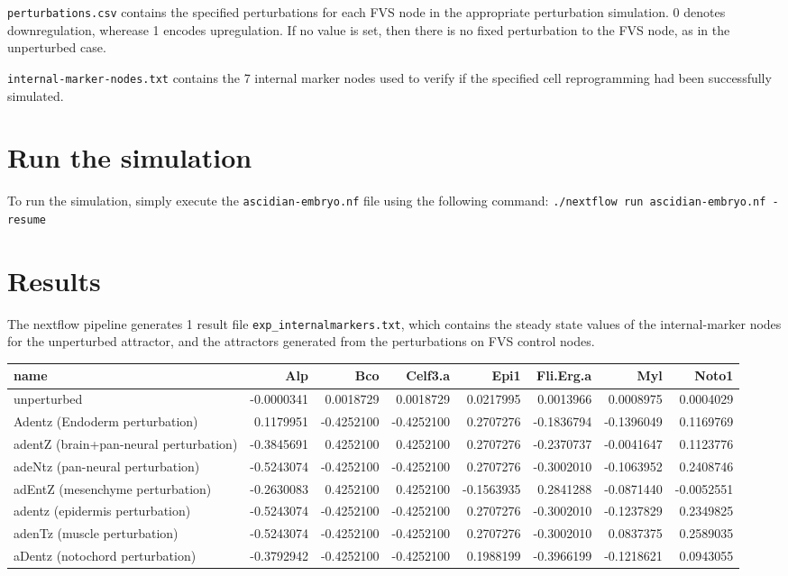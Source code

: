 \documentclass[
]{book}
\begin{document}
\texttt{perturbations.csv} contains the specified perturbations for each FVS node in the appropriate perturbation simulation. 0 denotes downregulation, wherease 1 encodes upregulation. If no value is set, then there is no fixed perturbation to the FVS node, as in the unperturbed case.

\texttt{internal-marker-nodes.txt} contains the 7 internal marker nodes used to verify if the specified cell reprogramming had been successfully simulated.

\hypertarget{run-the-simulation}{%
\section{Run the simulation}\label{run-the-simulation}}

To run the simulation, simply execute the \texttt{ascidian-embryo.nf} file using the following command: \texttt{./nextflow\ run\ ascidian-embryo.nf\ -resume}

\hypertarget{results}{%
\section{Results}\label{results}}

The nextflow pipeline generates 1 result file \texttt{exp\_internalmarkers.txt}, which contains the steady state values of the internal-marker nodes for the unperturbed attractor, and the attractors generated from the perturbations on FVS control nodes.

\begin{table}
\centering\begingroup\fontsize{8}{10}\selectfont

\begin{tabular}{l|r|r|r|r|r|r|r}
\hline
name & Alp & Bco & Celf3.a & Epi1 & Fli.Erg.a & Myl & Noto1\\
\hline
unperturbed & -0.0000341 & 0.0018729 & 0.0018729 & 0.0217995 & 0.0013966 & 0.0008975 & 0.0004029\\
\hline
Adentz (Endoderm perturbation) & 0.1179951 & -0.4252100 & -0.4252100 & 0.2707276 & -0.1836794 & -0.1396049 & 0.1169769\\
\hline
adentZ (brain+pan-neural perturbation) & -0.3845691 & 0.4252100 & 0.4252100 & 0.2707276 & -0.2370737 & -0.0041647 & 0.1123776\\
\hline
adeNtz (pan-neural perturbation) & -0.5243074 & -0.4252100 & -0.4252100 & 0.2707276 & -0.3002010 & -0.1063952 & 0.2408746\\
\hline
adEntZ (mesenchyme perturbation) & -0.2630083 & 0.4252100 & 0.4252100 & -0.1563935 & 0.2841288 & -0.0871440 & -0.0052551\\
\hline
adentz (epidermis perturbation) & -0.5243074 & -0.4252100 & -0.4252100 & 0.2707276 & -0.3002010 & -0.1237829 & 0.2349825\\
\hline
adenTz (muscle perturbation) & -0.5243074 & -0.4252100 & -0.4252100 & 0.2707276 & -0.3002010 & 0.0837375 & 0.2589035\\
\hline
aDentz (notochord perturbation) & -0.3792942 & -0.4252100 & -0.4252100 & 0.1988199 & -0.3966199 & -0.1218621 & 0.0943055\\
\hline
\end{tabular}
\endgroup{}
\end{table}
\end{document}

